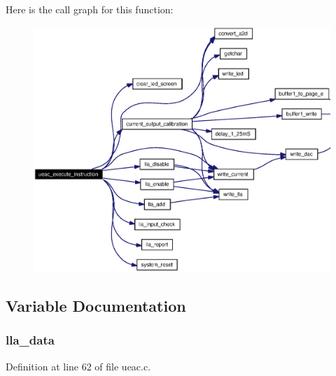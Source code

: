Here is the call graph for this function:\begin{figure}[H]
\begin{center}
\leavevmode
\includegraphics[width=355pt]{ueac_8c_a3_cgraph}
\end{center}
\end{figure}


\subsection{Variable Documentation}
\subsubsection{ {\bf lla\_\-data}}\label{ueac_8c_a0}




Definition at line 62 of file ueac.c.